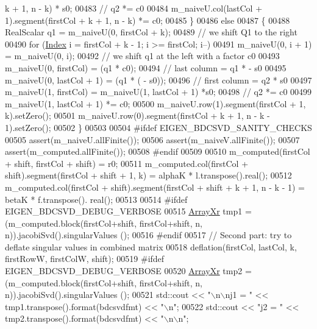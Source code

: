 \begin{DoxyCode}
      k + 1, n - k) * s0; 
00483     \textcolor{comment}{// q2 *= c0}
00484     m\_naiveU.col(lastCol + 1).segment(firstCol + k + 1, n - k) *= c0;
00485   \} 
00486   \textcolor{keywordflow}{else} 
00487   \{
00488     RealScalar q1 = m\_naiveU(0, firstCol + k);
00489     \textcolor{comment}{// we shift Q1 to the right}
00490     \textcolor{keywordflow}{for} (\hyperlink{namespace_eigen_a62e77e0933482dafde8fe197d9a2cfde}{Index} i = firstCol + k - 1; i >= firstCol; i--) 
00491       m\_naiveU(0, i + 1) = m\_naiveU(0, i);
00492     \textcolor{comment}{// we shift q1 at the left with a factor c0}
00493     m\_naiveU(0, firstCol) = (q1 * c0);
00494     \textcolor{comment}{// last column = q1 * - s0}
00495     m\_naiveU(0, lastCol + 1) = (q1 * ( - s0));
00496     \textcolor{comment}{// first column = q2 * s0}
00497     m\_naiveU(1, firstCol) = m\_naiveU(1, lastCol + 1) *s0; 
00498     \textcolor{comment}{// q2 *= c0}
00499     m\_naiveU(1, lastCol + 1) *= c0;
00500     m\_naiveU.row(1).segment(firstCol + 1, k).setZero();
00501     m\_naiveU.row(0).segment(firstCol + k + 1, n - k - 1).setZero();
00502   \}
00503   
00504 \textcolor{preprocessor}{#ifdef EIGEN\_BDCSVD\_SANITY\_CHECKS}
00505   assert(m\_naiveU.allFinite());
00506   assert(m\_naiveV.allFinite());
00507   assert(m\_computed.allFinite());
00508 \textcolor{preprocessor}{#endif}
00509   
00510   m\_computed(firstCol + shift, firstCol + shift) = r0;
00511   m\_computed.col(firstCol + shift).segment(firstCol + shift + 1, k) = alphaK * l.transpose().real();
00512   m\_computed.col(firstCol + shift).segment(firstCol + shift + k + 1, n - k - 1) = betaK * f.transpose().
      real();
00513 
00514 \textcolor{preprocessor}{#ifdef EIGEN\_BDCSVD\_DEBUG\_VERBOSE}
00515   \hyperlink{group___core___module}{ArrayXr} tmp1 = (m\_computed.block(firstCol+shift, firstCol+shift, n, n)).jacobiSvd().singularValues
      ();
00516 \textcolor{preprocessor}{#endif}
00517   \textcolor{comment}{// Second part: try to deflate singular values in combined matrix}
00518   deflation(firstCol, lastCol, k, firstRowW, firstColW, shift);
00519 \textcolor{preprocessor}{#ifdef EIGEN\_BDCSVD\_DEBUG\_VERBOSE}
00520   \hyperlink{group___core___module}{ArrayXr} tmp2 = (m\_computed.block(firstCol+shift, firstCol+shift, n, n)).jacobiSvd().singularValues
      ();
00521   std::cout << \textcolor{stringliteral}{"\(\backslash\)n\(\backslash\)nj1 = "} << tmp1.transpose().format(bdcsvdfmt) << \textcolor{stringliteral}{"\(\backslash\)n"};
00522   std::cout << \textcolor{stringliteral}{"j2 = "} << tmp2.transpose().format(bdcsvdfmt) << \textcolor{stringliteral}{"\(\backslash\)n\(\backslash\)n"};

\end{DoxyCode}
